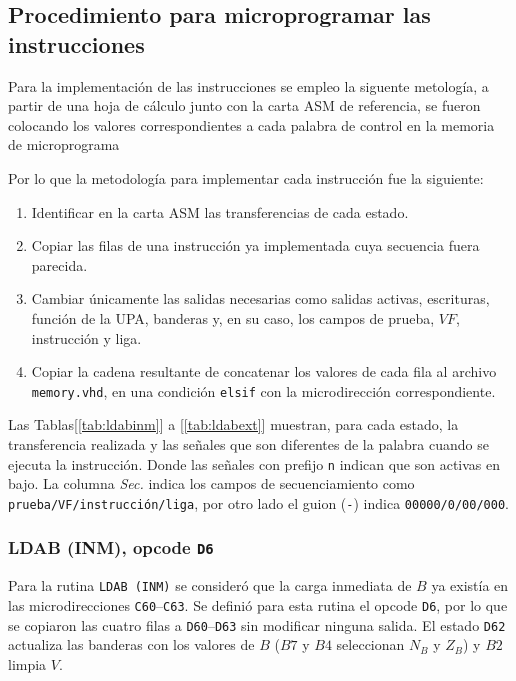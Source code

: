 \documentclass[letterpaper,12pt]{article}
\newcommand{\hx}[1]{\texttt{#1}}
\begin{document}
\subsection{Procedimiento para microprogramar las instrucciones}

Para la implementación de las instrucciones se empleo la siguente metología, a partir de una hoja de cálculo junto con la carta ASM de referencia, se fueron colocando los valores correspondientes a cada palabra de control en la memoria de microprograma

Por lo que la metodología para implementar cada instrucción fue la siguiente:

\begin{enumerate}
  \item Identificar en la carta ASM las transferencias de cada estado.
  \item Copiar las filas de una instrucción ya implementada cuya secuencia fuera parecida.
  \item Cambiar únicamente las salidas necesarias como salidas activas, escrituras, función de la UPA, banderas y, en su caso, los campos de prueba, $VF$, instrucción y liga.
  \item Copiar la cadena resultante de concatenar los valores de cada fila al archivo \texttt{memory.vhd}, en una condición \texttt{elsif} con la microdirección correspondiente.
\end{enumerate}

Las Tablas[\ref{tab:ldabinm}] a [\ref{tab:ldabext}] muestran, para cada estado, la transferencia realizada y las señales que son diferentes de la palabra cuando se ejecuta la instrucción. Donde las señales con prefijo \texttt{n} indican que son activas en bajo. La columna \emph{Sec.} indica los campos de secuenciamiento como \texttt{prueba/VF/instrucción/liga}, por otro lado  el guion (\texttt{-}) indica \texttt{00000/0/00/000}.

\subsubsection{LDAB (INM), opcode \texttt{D6}}

Para la rutina \texttt{LDAB (INM)} se consideró que la carga inmediata de $B$ ya existía en las microdirecciones \hx{C60}--\hx{C63}. Se definió para esta rutina el opcode \hx{D6}, por lo que se copiaron las cuatro filas a \hx{D60}--\hx{D63} sin modificar ninguna salida. El estado \hx{D62} actualiza las banderas con los valores de $B$ ($B7$ y $B4$ seleccionan $N_B$ y $Z_B$) y $B2$ limpia $V$.
\end{document}
